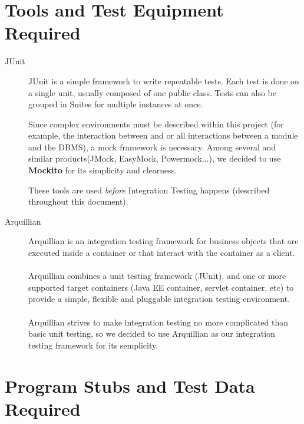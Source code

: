 \documentclass[a4paper, 12pt]{article}
\newcounter{tc}
\begin{document}

\newpage
\section{Tools and Test Equipment Required}
\label{sub:tools_and_test_equipment_required}

\begin{description}
    \item[JUnit] JUnit is a simple framework to write repeatable tests. Each test is done on a single unit, usually composed of one public class. Tests can also be grouped in Suites for multiple instances at once.

    Since complex environments must be described within this project (for example, the interaction between  and  or all interactions between a module and the DBMS), a mock framework is necessary. Among several and similar products(JMock, EasyMock, Powermock...), we decided to use \textbf{Mockito} for its simplicity and clearness.

    These tools are used \emph{before} Integration Testing happens (described throughout this document).

    \item[Arquillian] Arquillian is an integration testing framework for business objects that are executed inside a container or that interact with the container as a client. \\
\\
Arquillian combines a unit testing framework (JUnit), and one or more supported target containers (Java EE container, servlet container, etc) to provide a simple, flexible and pluggable integration testing environment. \\ \\ 
Arquillian strives to make integration testing no more complicated than basic unit testing, so we decided to use Arquillian as our integration testing framework for its semplicity.


\end{description}

\newpage
\section{Program Stubs and Test Data Required}
\label{sub:program_stubs_and_test_data_required}
\end{document}

